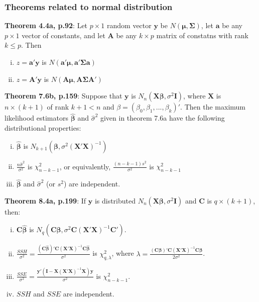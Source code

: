 \documentclass[]{article}
\begin{document}
\subsubsection{Theorems related to normal distribution}
\textbf{Theorem 4.4a, p.92}: Let $p\times 1$ random vector $\pmb{y}$ be $N(\pmb{\mu}, \pmb{\Sigma})$, let $\pmb{a}$ be any $p\times 1$ vector of constants, and let $\pmb{A}$ be any $k\times p$ matrix of constatns with rank $k\leq p$. Then 
\begin{enumerate}[(i)]
	\item $z = \pmb{a}'\pmb{y}$ is $N(\pmb{a}'\pmb{\mu}, \pmb{a}'\pmb{\Sigma}\pmb{a})$
	\item $z = \pmb{A}'\pmb{y}$ is $N(\pmb{A}\pmb{\mu}, \pmb{A}\pmb{\Sigma}\pmb{A}')$
\end{enumerate}
\textbf{Theorem 7.6b, p.159}: Suppose that $\pmb{y}$ is $N_n(\pmb{X}\pmb{\beta}, \sigma^2\pmb{I})$, where $\pmb{X}$ is $n\times (k+1)$ of rank $k+1<n$ and $\beta = (\beta_0, \beta_1, ..., \beta_k)'$. Then the maximum likelihood estimators $\hat{\pmb{\beta}}$ and $\hat{\sigma}^2$ given in theorem 7.6a have the following distributional properties:
\begin{enumerate}[(i)]
	\item $\hat{\pmb{\beta}}$ is  $N_{k+1}(\pmb{\beta}, \sigma^2(\pmb{X}'\pmb{X})^{-1})$
	\item $\frac{n \hat{\sigma}^2}{\sigma^2}$ is $\chi^2_{n-k-1}$, or equivalently, $\frac{(n-k-1) s^2}{\sigma^2}$ is $\chi^2_{n-k-1}$
	\item $\hat{\pmb{\beta}}$ and $\hat{\sigma}^2$ (or $s^2$) are independent.
\end{enumerate}
\textbf{Theorem 8.4a, p.199}: If $\pmb{y}$ is distributed $N_n(\pmb{X}\pmb{\beta}, \sigma^2\pmb{I})$ and $\pmb{C}$ is $q\times (k+1)$, then:
\begin{enumerate}[(i)]
	\item $\pmb{C}\hat{\pmb{\beta}}$ is  $N_q(\pmb{C\beta}, \sigma^2\pmb{C}(\pmb{X}'\pmb{X})^{-1}\pmb{C}')$.
	\item $\frac{SSH}{\sigma^2} = \frac{(\pmb{C}\hat{\pmb{\beta}})' \pmb{C}(\pmb{X}'\pmb{X})^{-1} \pmb{C}\hat{\pmb{\beta}}}{\sigma^2}$ is $\chi^2_{q, \lambda}$, where $\lambda = \frac{(\pmb{C}\pmb{\beta})' \pmb{C}(\pmb{X}'\pmb{X})^{-1} \pmb{C}\pmb{\beta}}{2\sigma^2}$.
	\item $\frac{SSE}{\sigma^2} = \frac{\pmb{y}'(\pmb{I}- \pmb{X}(\pmb{X}'\pmb{X})^{-1}\pmb{X})\pmb{y}}{\sigma^2}$ is $\chi^2_{n-k-1}$.
	\item $SSH$ and $SSE$ are independent.
\end{enumerate}
\end{document}

